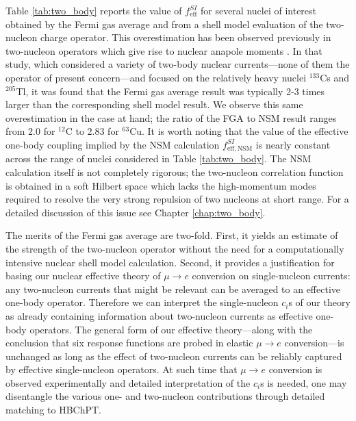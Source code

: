 \documentclass{book}[letterpaper,12pt]
\begin{document}
Table \ref{tab:two_body} reports the value of $f_\mathrm{eff}^{SI}$ for several nuclei of interest obtained by the Fermi gas average and from a shell model evaluation of the two-nucleon charge operator. This overestimation has been observed previously in two-nucleon operators which give rise to nuclear anapole moments \cite{2002PhRvC..65d5502H}. In that study, which considered a variety of two-body nuclear currents---none of them the operator of present concern---and focused on the relatively heavy nuclei $^{133}$Cs and $^{205}$Tl, it was found that the Fermi gas average result was typically 2-3 times larger than the corresponding shell model result. We observe this same overestimation in the case at hand; the ratio of the FGA to NSM result ranges from 2.0 for $^{12}$C to 2.83 for $^{63}$Cu. It is worth noting that the value of the effective one-body coupling implied by the NSM calculation $f^{SI}_\mathrm{eff,NSM}$ is nearly constant across the range of nuclei considered in Table \ref{tab:two_body}. The NSM calculation itself is not completely rigorous; the two-nucleon correlation function is obtained in a soft Hilbert space which lacks the high-momentum modes required to resolve the very strong repulsion of two nucleons at short range. For a detailed discussion of this issue see Chapter \ref{chap:two_body}.

The merits of the Fermi gas average are two-fold. First, it yields an estimate of the strength of the two-nucleon operator without the need for a computationally intensive nuclear shell model calculation. Second, it provides a justification for basing our nuclear effective theory of $\mu\rightarrow e$ conversion on single-nucleon currents: any two-nucleon currents that might be relevant can be averaged to an effective one-body operator. Therefore we can interpret the single-nucleon $c_i$s of our theory as already containing information about two-nucleon currents as effective one-body operators. The general form of our effective theory---along with the conclusion that six response functions are probed in elastic $\mu\rightarrow e$ conversion---is unchanged as long as the effect of two-nucleon currents can be reliably captured by effective single-nucleon operators. At such time that $\mu\rightarrow e$ conversion is observed experimentally and detailed interpretation of the $c_i$s is needed, one may disentangle the various one- and two-nucleon contributions through detailed matching to HBChPT.
\end{document}
